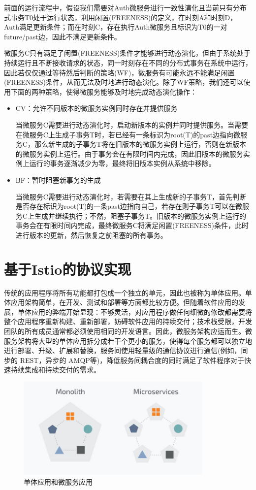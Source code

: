 \documentclass[12pt,a4paper]{article}
\theoremstyle{definition}
\begin{document}
前面的运行流程中，假设我们需要对Auth微服务进行一致性演化且当前只有分布式事务T0处于运行状态，利用闲置(FREENESS)的定义，在时刻A和时刻D，Auth满足更新条件；而在时刻C，存在执行Auth微服务且标识为T0的一对future/past边，因此不满足更新条件。

微服务C只有满足了闲置(FREENESS)条件才能够进行动态演化，但由于系统处于持续运行且不断接收请求的状态，同一时刻存在不同的分布式事务在系统中运行，因此若仅仅通过等待然后判断的策略(WF)，微服务有可能永远不能满足闲置(FREENESS)条件，从而无法及时地进行动态演化。除了WF策略，我们还可以使用下面的两种策略，使得微服务能够及时地完成动态演化操作：

\begin{itemize}

\item {CV：允许不同版本的微服务实例同时存在并提供服务

当微服务C需要进行动态演化时，启动新版本的实例并同时提供服务。当需要在微服务C上生成子事务T时，若已经有一条标识为root(T)的past边指向微服务C，那么新生成的子事务T将在旧版本的微服务实例上运行，否则在新版本的微服务实例上运行。由于事务会在有限时间内完成，因此旧版本的微服务实例上运行的事务逐渐减少为零，最终将旧版本实例从系统中移除。}

\item{BF：暂时阻塞新事务的生成

当微服务C需要进行动态演化时，若需要在其上生成新的子事务T，首先判断是否存在标识为root(T)的一条past边指向自己，若存在则子事务T可以在微服务C上生成并继续执行；不然，阻塞子事务T。旧版本的微服务实例上运行的事务会在有限时间内完成，最终微服务C将满足闲置(FREENESS)条件，此时进行版本的更新，然后恢复之前阻塞的所有事务。}
\end{itemize}

\newpage
\section{基于Istio的协议实现}\label{baseistio}
传统的应用程序将所有功能都打包成一个独立的单元，因此也被称为单体应用。单体应用架构简单，在开发、测试和部署等方面都比较方便。但随着软件应用的发展，单体应用的弊端开始显现：不够灵活，对应用程序做任何细微的修改都需要将整个应用程序重新构建、重新部署，妨碍软件应用的持续交付；技术栈受限，开发团队的所有成员通常都必须使用相同的开发语言。因此，微服务架构应运而生。微服务架构将大型的单体应用拆分成若干个更小的服务，使得每个服务都可以独立地进行部署、升级、扩展和替换，服务间使用轻量级的通信协议进行通信(例如，同步的 REST，异步的 AMQP等)，降低服务间耦合度的同时满足了软件程序对于快速持续集成和持续交付的需求。
\begin{figure}[ht]
 \centering
 \includegraphics[height=5cm]{images/Microservices-vs-Monolith.jpg}
 \caption{单体应用和微服务应用}
 \label{fig:Microservices-vs-Monolith}
\end{figure}
\end{document}
